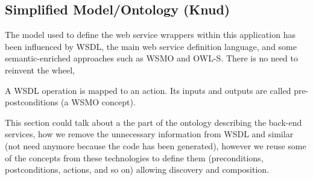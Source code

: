 
\subsection{Simplified Model/Ontology (Knud)}
The model used to define the web service wrappers within this application has been influenced by WSDL, the main web service definition language, and some semantic-enriched approaches such as WSMO and OWL-S. There is no need to reinvent the wheel, 

A WSDL operation is mapped to an action. Its inputs and outputs are called pre-postconditions (a WSMO concept). 

This section could talk about a the part of the ontology describing the back-end services, how we remove the unnecessary information from WSDL and similar (not need anymore because the code has been generated), however we reuse some of the concepts from these technologies to define them (preconditions, postconditions, actions, and so on) allowing discovery and composition.


